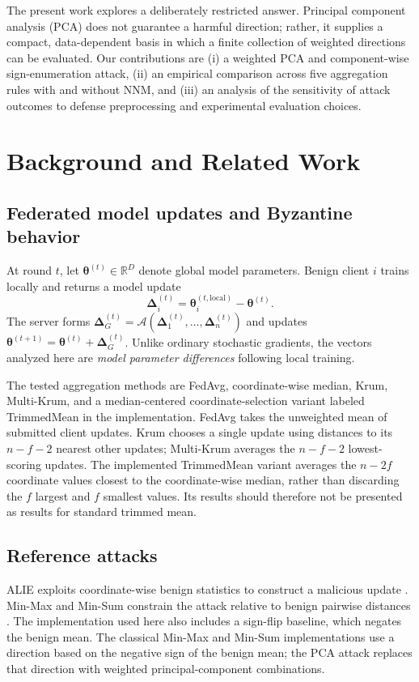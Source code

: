 \documentclass[11pt,a4paper]{article}
\newcommand{\upd}{\boldsymbol{\Delta}}
\newcommand{\agg}{\mathcal{A}}
\begin{document}
The present work explores a deliberately restricted answer. Principal component analysis (PCA) does not guarantee a harmful direction; rather, it supplies a compact, data-dependent basis in which a finite collection of weighted directions can be evaluated. Our contributions are (i) a weighted PCA and component-wise sign-enumeration attack, (ii) an empirical comparison across five aggregation rules with and without NNM, and (iii) an analysis of the sensitivity of attack outcomes to defense preprocessing and experimental evaluation choices.

\section{Background and Related Work}
\subsection{Federated model updates and Byzantine behavior}
At round $t$, let $\boldsymbol{\theta}^{(t)}\in\mathbb{R}^D$ denote global model parameters. Benign client $i$ trains locally and returns a model update
\begin{equation}
\upd_i^{(t)}=\boldsymbol{\theta}_i^{(t,\mathrm{local})}-\boldsymbol{\theta}^{(t)}.
\end{equation}
The server forms $\upd_G^{(t)}=\agg(\upd_1^{(t)},\ldots,\upd_n^{(t)})$ and updates $\boldsymbol{\theta}^{(t+1)}=\boldsymbol{\theta}^{(t)}+\upd_G^{(t)}$. Unlike ordinary stochastic gradients, the vectors analyzed here are \emph{model parameter differences} following local training.

The tested aggregation methods are FedAvg, coordinate-wise median, Krum, Multi-Krum, and a median-centered coordinate-selection variant labeled TrimmedMean in the implementation. FedAvg takes the unweighted mean of submitted client updates. Krum chooses a single update using distances to its $n-f-2$ nearest other updates; Multi-Krum averages the $n-f-2$ lowest-scoring updates. The implemented TrimmedMean variant averages the $n-2f$ coordinate values closest to the coordinate-wise median, rather than discarding the $f$ largest and $f$ smallest values. Its results should therefore not be presented as results for standard trimmed mean.

\subsection{Reference attacks}
ALIE exploits coordinate-wise benign statistics to construct a malicious update \cite{baruch2019}. Min-Max and Min-Sum constrain the attack relative to benign pairwise distances \cite{shejwalkar2021}. The implementation used here also includes a sign-flip baseline, which negates the benign mean. The classical Min-Max and Min-Sum implementations use a direction based on the negative sign of the benign mean; the PCA attack replaces that direction with weighted principal-component combinations.
\end{document}
